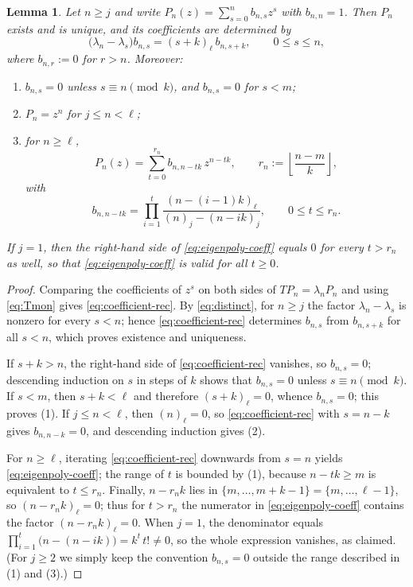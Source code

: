 \documentclass{amsart}
\newtheorem{lemma}[theorem]{Lemma}
\theoremstyle{definition}
\newcommand{\fall}[2]{(#1)_{#2}}
\begin{document}
\begin{lemma}\label{lem:eigenpolys}
Let \(n\ge j\) and write \(P_n(z)=\sum_{s=0}^n b_{n,s}z^s\) with
\(b_{n,n}=1\).  Then \(P_n\) exists and is unique, and its coefficients are
determined by
\begin{equation}\label{eq:coefficient-rec}
\bigl(\lambda_n-\lambda_s\bigr)b_{n,s}
=
\fall{s+k}{\ell}\,b_{n,s+k},
\qquad 0\le s\le n,
\end{equation}
where \(b_{n,r}:=0\) for \(r>n\).  Moreover:
\begin{enumerate}
\item \(b_{n,s}=0\) unless \(s\equiv n \pmod k\), and \(b_{n,s}=0\) for
\(s<m\);
\item \(P_n=z^n\) for \(j\le n<\ell\);
\item for \(n\ge\ell\),
\begin{equation}\label{eq:eigenpoly-support}
P_n(z)=\sum_{t=0}^{r_n}b_{n,n-tk}\,z^{n-tk},
\qquad r_n:=\left\lfloor\frac{n-m}{k}\right\rfloor,
\end{equation}
with
\begin{equation}\label{eq:eigenpoly-coeff}
b_{n,n-tk}
=
\prod_{i=1}^{t}
\frac{\fall{n-(i-1)k}{\ell}}{\fall{n}{j}-\fall{n-ik}{j}},
\qquad 0\le t\le r_n .
\end{equation}
\end{enumerate}
If \(j=1\), then the right-hand side of \eqref{eq:eigenpoly-coeff} equals
\(0\) for every \(t>r_n\) as well, so that \eqref{eq:eigenpoly-coeff} is
valid for all \(t\ge0\).
\end{lemma}

\begin{proof}
Comparing the coefficients of \(z^s\) on both sides of
\(TP_n=\lambda_nP_n\) and using \eqref{eq:Tmon} gives
\eqref{eq:coefficient-rec}.  By \eqref{eq:distinct}, for \(n\ge j\) the
factor \(\lambda_n-\lambda_s\) is nonzero for every \(s<n\); hence
\eqref{eq:coefficient-rec} determines \(b_{n,s}\) from \(b_{n,s+k}\) for all
\(s<n\), which proves existence and uniqueness.

If \(s+k>n\), the right-hand side of \eqref{eq:coefficient-rec} vanishes, so
\(b_{n,s}=0\); descending induction on \(s\) in steps of \(k\) shows that
\(b_{n,s}=0\) unless \(s\equiv n\pmod k\).  If \(s<m\), then
\(s+k<\ell\) and therefore \(\fall{s+k}{\ell}=0\), whence \(b_{n,s}=0\);
this proves (1).  If \(j\le n<\ell\), then \(\fall{n}{\ell}=0\), so
\eqref{eq:coefficient-rec} with \(s=n-k\) gives \(b_{n,n-k}=0\), and
descending induction gives (2).

For \(n\ge\ell\), iterating \eqref{eq:coefficient-rec} downwards from
\(s=n\) yields \eqref{eq:eigenpoly-coeff}; the range of \(t\) is bounded by
(1), because \(n-tk\ge m\) is equivalent to \(t\le r_n\).  Finally,
\(n-r_n k\) lies in \(\{m,\dots,m+k-1\}=\{m,\dots,\ell-1\}\), so
\(\fall{n-r_n k}{\ell}=0\); thus for \(t>r_n\) the numerator in
\eqref{eq:eigenpoly-coeff} contains the factor \(\fall{n-r_n k}{\ell}=0\).
When \(j=1\), the denominator equals
\(\prod_{i=1}^{t}\bigl(n-(n-ik)\bigr)=k^t\,t!\ne0\), so the whole expression
vanishes, as claimed.  (For \(j\ge2\) we simply keep the convention
\(b_{n,s}=0\) outside the range described in (1) and (3).)
\end{proof}
\end{document}
